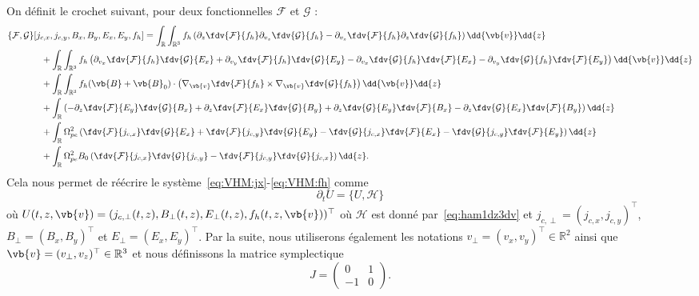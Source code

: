 On définit le crochet suivant, pour deux fonctionnelles $\mathcal{F}$ et $\mathcal{G}$ :
\begin{equation}
  \begin{aligned}
    \{ \mathcal{F},\mathcal{G} \}[ j_{c,x}, j_{c,y}, B_x, B_y, E_x, E_y, f_h] &=
                       \int_{\mathbb{R}}\int_{\mathbb{R}^3} f_h \left( \partial_z\fdv{\mathcal{F}}{f_h}\partial_{v_z}\fdv{\mathcal{G}}{f_h} - \partial_{v_z}\fdv{\mathcal{F}}{f_h}\partial_z\fdv{\mathcal{G}}{f_h} \right) \dd{\vb{v}}\dd{z} \\
      &\hspace{-4cm} + \int_{\mathbb{R}}\int_{\mathbb{R}^3} f_h \left(
            \partial_{v_x}\fdv{\mathcal{F}}{f_h}\fdv{\mathcal{G}}{E_x} + \partial_{v_y}\fdv{\mathcal{F}}{f_h}\fdv{\mathcal{G}}{E_y}
          - \partial_{v_x}\fdv{\mathcal{G}}{f_h}\fdv{\mathcal{F}}{E_x} - \partial_{v_y}\fdv{\mathcal{G}}{f_h}\fdv{\mathcal{F}}{E_y}
          \right) \dd{\vb{v}}\dd{z} \\
      &\hspace{-4cm} + \int_{\mathbb{R}}\int_{\mathbb{R}^3} f_h(\vb{B}+\vb{B}_0)\cdot\left( \nabla_{\vb{v}}\fdv{\mathcal{F}}{f_h}\times\nabla_{\vb{v}}\fdv{\mathcal{G}}{f_h} \right) \dd{\vb{v}}\dd{z} \\
      &\hspace{-4cm} + \int_{\mathbb{R}} \left(
          - \partial_z\fdv{\mathcal{F}}{E_y}\fdv{\mathcal{G}}{B_x} + \partial_z\fdv{\mathcal{F}}{E_x}\fdv{\mathcal{G}}{B_y}
          + \partial_z\fdv{\mathcal{G}}{E_y}\fdv{\mathcal{F}}{B_x} - \partial_z\fdv{\mathcal{G}}{E_x}\fdv{\mathcal{F}}{B_y}
          \right) \dd{z} \\
      &\hspace{-4cm} + \int_{\mathbb{R}} \Omega_{pe}^2 \left(
            \fdv{\mathcal{F}}{j_{c,x}}\fdv{\mathcal{G}}{E_x} + \fdv{\mathcal{F}}{j_{c,y}}\fdv{\mathcal{G}}{E_y}
          - \fdv{\mathcal{G}}{j_{c,x}}\fdv{\mathcal{F}}{E_x} - \fdv{\mathcal{G}}{j_{c,y}}\fdv{\mathcal{F}}{E_y}
          \right) \dd{z} \\
      &\hspace{-4cm} + \int_{\mathbb{R}} \Omega_{pe}^2B_0 \left(
            \fdv{\mathcal{F}}{j_{c,x}}\fdv{\mathcal{G}}{j_{c,y}}
          - \fdv{\mathcal{F}}{j_{c,y}}\fdv{\mathcal{G}}{j_{c,x}}
          \right) \dd{z}.
  \end{aligned}
  \label{bracket}
\end{equation}
Cela nous permet de réécrire le système~\eqref{eq:VHM:jx}-\eqref{eq:VHM:fh} comme 
$$
  \partial_t U = \{ U,\mathcal{H} \}
$$
où $U(t,z,\vb{v}) = ( j_{c,\perp}(t,z) , B_\perp(t,z) , E_\perp(t,z) , f_h(t,z,\vb{v}) )^\top$ où $\mathcal{H}$ est donné par~\eqref{eq:ham1dz3dv} et $j_{c,\perp}=(j_{c,x},j_{c,y})^\top$, $B_{\perp}=(B_{x},B_{y})^\top$ et $E_{\perp}=(E_{x},E_{y})^\top$. Par la suite, nous utiliserons également les notations $v_\perp = (v_x,v_y)^\top\in\mathbb{R}^2$ ainsi que $\vb{v} = (v_\perp,v_z)^\top\in\mathbb{R}^3$ et nous définissons la matrice symplectique 
$$
  J = \begin{pmatrix}
     0 & 1 \\
    -1 & 0
  \end{pmatrix}.
$$

